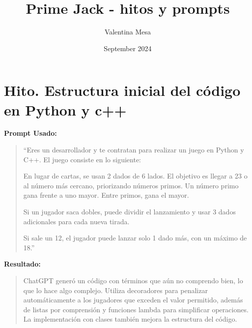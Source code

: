 \documentclass{article}
\title{Prime Jack - hitos y prompts}
\author{Valentina Mesa}
\date{September 2024}
\begin{document}
\maketitle

\section{Hito. Estructura inicial del código en Python y c++}


\textbf{Prompt Usado:}

\begin{quote}
“Eres un desarrollador y te contratan para realizar un juego en Python y C++. El juego consiste en lo siguiente:

En lugar de cartas, se usan 2 dados de 6 lados. El objetivo es llegar a 23 o al número más cercano, priorizando números primos. Un número primo gana frente a uno mayor. Entre primos, gana el mayor.

Si un jugador saca dobles, puede dividir el lanzamiento y usar 3 dados adicionales para cada nueva tirada.

Si sale un 12, el jugador puede lanzar solo 1 dado más, con un máximo de 18.”
\end{quote}

\textbf{Resultado:}
\begin{quote}
ChatGPT generó un código con términos que aún no comprendo bien, lo que lo hace algo complejo. Utiliza decoradores para penalizar automáticamente a los jugadores que exceden el valor permitido, además de listas por comprensión y funciones lambda para simplificar operaciones. La implementación con clases también mejora la estructura del código.

    
\end{quote}
\end{document}
